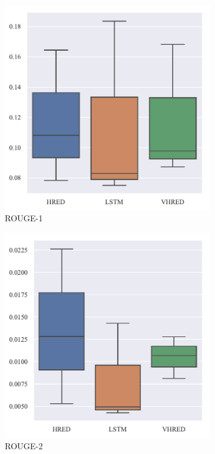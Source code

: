 \begin{figure}[H]
    \begin{subfigure}{0.5\linewidth}
        \centering
        \includegraphics[width=0.8\linewidth]{figure/boxplot/model/rouge_1/plot.pdf}
        \caption{ROUGE-1}
    \end{subfigure}%
    \begin{subfigure}{0.5\linewidth}
        \centering
        \includegraphics[width=0.8\linewidth]{figure/boxplot/model/rouge_2/plot.pdf}
        \caption{ROUGE-2}
    \end{subfigure}
    \begin{subfigure}{0.5\linewidth}

\end{subfigure}
\end{figure}
